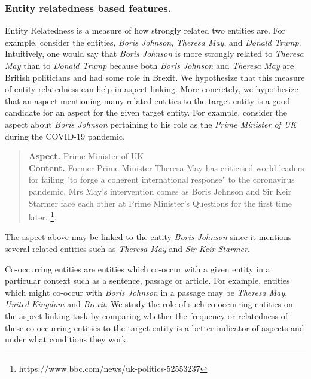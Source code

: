 \subsubsection{Entity relatedness based features.} 
\label{subsubsec:Entity relatedness based features}
Entity Relatedness is a measure of how strongly related two entities are. For example, consider the entities, \textit{Boris Johnson}, \textit{Theresa May}, and \textit{Donald Trump}. Intuitively, one would say that \textit{Boris Johnson} is more strongly related to \textit{Theresa May} than to \textit{Donald Trump} because both \textit{Boris Johnson} and \textit{Theresa May} are British politicians and had some role in Brexit. We hypothesize that this measure of entity relatedness can help in aspect linking. More concretely, we hypothesize that an aspect mentioning many related entities to the target entity  is a good candidate for an aspect for the given target entity. For example, consider the aspect about \textit{Boris Johnson} pertaining to his role as the \textit{Prime Minister of UK} during the COVID-19 pandemic.

\begin{quote}
    \textbf{Aspect.} Prime Minister of UK \\
    \textbf{Content.}
    Former Prime Minister Theresa May has criticised world leaders for failing "to forge a coherent international response" to the coronavirus pandemic. Mrs May's intervention comes as Boris Johnson and Sir Keir Starmer face each other at Prime Minister's Questions for the first time later. \footnote{https://www.bbc.com/news/uk-politics-52553237}.
\end{quote}
The aspect above may be linked to the entity \textit{Boris Johnson} since it mentions several related entities such as \textit{Theresa May} and \textit{Sir Keir Starmer}. 

Co-occurring entities are entities which co-occur with a given entity in a particular context such as a sentence, passage or article. For example, entities which might co-occur with \textit{Boris Johnson} in a passage may be \textit{Theresa May}, \textit{United Kingdom} and \textit{Brexit}. We study the role of such co-occurring entities on the aspect linking task by comparing whether the frequency or relatedness of these co-occurring entities to the target entity is a better indicator of aspects and under what conditions they work. 


